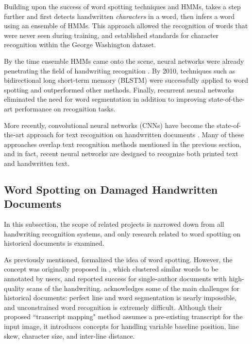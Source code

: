 \documentclass[final]{ukthesis}
\begin{document}
Building upon the success of word spotting techniques and HMMs, \cite{howe2009finding} takes a step further and first detects handwritten {\em characters} in a word, then infers a word using an ensemble of HMMs. This approach allowed the recognition of words that were never seen during training, and established standards for character recognition within the George Washington dataset.

By the time ensemble HMMs came onto the scene, neural networks were already penetrating the field of handwriting recognition \cite{fernandez2007application}. By 2010, techniques such as bidirectional long short-term memory (BLSTM) were successfully applied to word spotting \cite{wang2010word} and outperformed other methods. Finally, recurrent neural networks \cite{frinken2012novel} eliminated the need for word segmentation in addition to improving state-of-the-art performance on recognition tasks.

More recently, convolutional neural networks (CNNs) have become the state-of-the-art approach for text recognition on handwritten documents \cite{zhong2016spottingnet,sudholt2016phocnet}. Many of these approaches overlap text recognition methods mentioned in the previous section, and in fact, recent neural networks are designed to recognize both printed text and handwritten text.


\subsection{Word Spotting on Damaged Handwritten Documents}
In this subsection, the scope of related projects is narrowed down from all handwriting recognition systems, and only research related to word spotting on historical documents is examined.

As previously mentioned, \cite{rath2007word} formalized the idea of word spotting. However, the concept was originally proposed in \cite{manmatha1996word}, which clustered similar words to be annotated by users, and reported success for single-author documents with high-quality scans of the handwriting. \cite{tomai2002transcript} acknowledges some of the main challenges for historical documents: perfect line and word segmentation is nearly impossible, and unconstrained word recognition is extremely difficult. Although their proposed ``transcript mapping" method assumes a pre-existing transcript for the input image, it introduces concepts for handling variable baseline position, line skew, character size, and inter-line distance.
\end{document}

